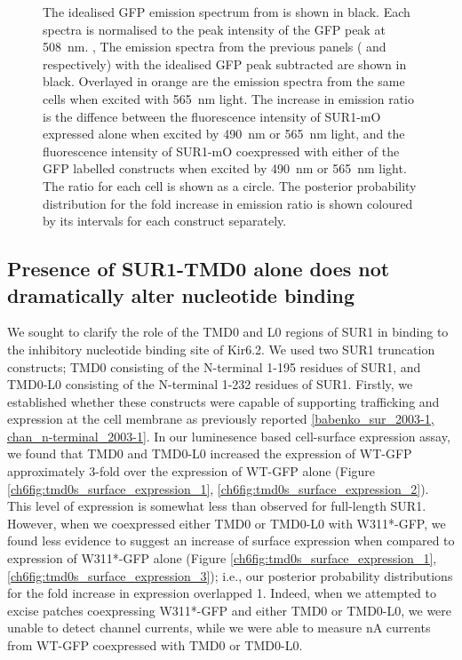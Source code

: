 \begin{figure}[h]
{	The idealised GFP emission spectrum from  is shown in black.
	Each spectra is normalised to the peak intensity of the GFP peak at \SI{508}{\nano\metre}.
	,  The emission spectra from the previous panels ( and  respectively) with the idealised GFP peak subtracted are shown in black.
	Overlayed in orange are the emission spectra from the same cells when excited with \SI{565}{\nano\metre} light.
	 The increase in emission ratio is the diffence between the fluorescence intensity of SUR1-mO expressed alone when excited by \SI{490}{\nano\metre} or \SI{565}{\nano\metre} light, and the fluorescence intensity of SUR1-mO coexpressed with either of the GFP labelled constructs when excited by \SI{490}{\nano\metre} or \SI{565}{\nano\metre} light.
	The ratio for each cell is shown as a circle.
	The posterior probability distribution for the fold increase in emission ratio is shown coloured by its intervals for each construct separately.
	}\label{ch6fig:sur_assays}
\end{figure}

\subsection{Presence of SUR1-TMD0 alone does not dramatically alter nucleotide binding}

We sought to clarify the role of the TMD0 and L0 regions of SUR1 in binding to the inhibitory nucleotide binding site of Kir6.2.
We used two SUR1 truncation constructs; TMD0 consisting of the N-terminal 1-195 residues of SUR1, and TMD0-L0 consisting of the N-terminal 1-232 residues of SUR1.
Firstly, we established whether these constructs were capable of supporting trafficking and expression at the cell membrane as previously reported \ref{babenko_sur_2003-1, chan_n-terminal_2003-1}.
In our luminesence based cell-surface expression assay, we found that TMD0 and TMD0-L0 increased the expression of WT-GFP approximately 3-fold over the expression of WT-GFP alone (Figure \ref{ch6fig:tmd0s_surface_expression_1}, \ref{ch6fig:tmd0s_surface_expression_2}).
This level of expression is somewhat less than observed for full-length SUR1.
However, when we coexpressed either TMD0 or TMD0-L0 with W311*-GFP, we found less evidence to suggest an increase of surface expression when compared to expression of W311*-GFP alone (Figure \ref{ch6fig:tmd0s_surface_expression_1}, \ref{ch6fig:tmd0s_surface_expression_3});
i.e., our posterior probability distributions for the fold increase in expression overlapped 1.
Indeed, when we attempted to excise patches coexpressing W311*-GFP and either TMD0 or TMD0-L0, we were unable to detect channel currents, while we were able to measure \si{\nano\ampere} currents from WT-GFP coexpressed with TMD0 or TMD0-L0.

